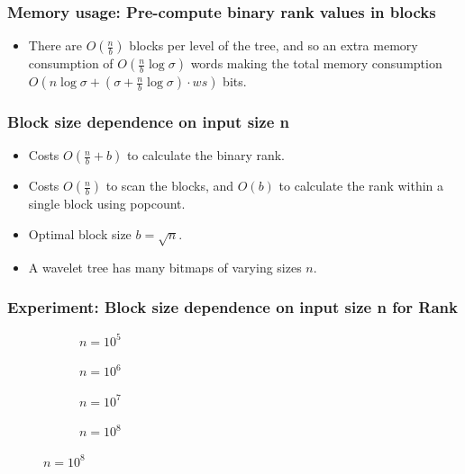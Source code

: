 \documentclass{beamer}
\begin{document}
\begin{frame}
\frametitle{Memory usage: Pre-compute binary rank values in blocks}
\begin{itemize}
\item There are $O(\frac{n}{b})$ blocks per level of the tree, and so an extra memory consumption of $O(\frac{n}{b} \log \sigma)$ words making the total memory consumption $O(n \log \sigma + (\sigma + \frac{n}{b} \log \sigma) \cdot \mathit{ws})$ bits.
\end{itemize}
\begin{center}
\begin{tiny}
\scalebox{0.9}{}
\end{tiny}
\end{center}
\end{frame}



\begin{frame}
\frametitle{Block size dependence on input size n}
\begin{itemize}
\item Costs $O(\frac{n}{b} + b)$ to calculate the binary rank.
\item Costs $O(\frac{n}{b})$ to scan the blocks, and $O(b)$ to calculate the rank within a single block using popcount. 
\item Optimal block size $b = \sqrt{n}$.
\item A wavelet tree has many bitmaps of varying sizes $n$.
\end{itemize}
\end{frame}

\begin{frame}
\frametitle{Experiment: Block size dependence on input size n for Rank}
\begin{figure}\small
\begin{subfigure}{0.4\textwidth}
	\scalebox{.45}{}
	\caption{$n = 10^5$}
\end{subfigure}
\hfill
\begin{subfigure}{0.4\textwidth}
	\scalebox{.45}{}
	\caption{$n = 10^6$}
\end{subfigure}

\begin{subfigure}{0.4\textwidth}
	\scalebox{.45}{}
	\caption{$n = 10^7$}
\end{subfigure}
\hfill	
\begin{subfigure}{0.4\textwidth}
	\scalebox{.45}{}
	\caption{$n = 10^8$}
\end{subfigure}
\end{figure}
\end{frame}
\end{document}

